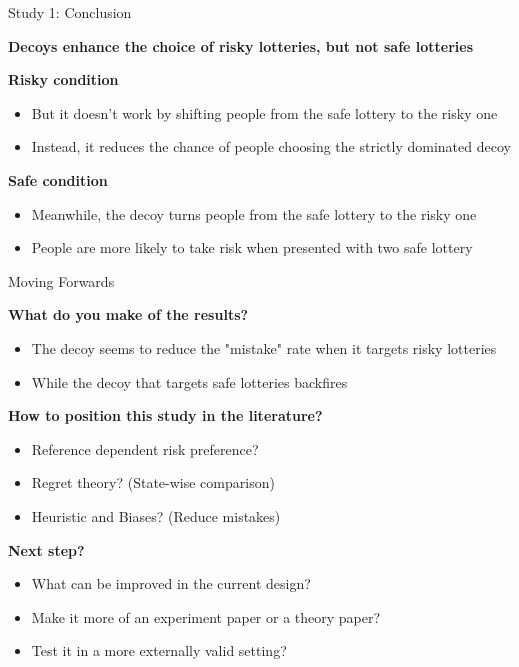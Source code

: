\documentclass[
  ignorenonframetext,
  aspectratio=169]{beamer}
\begin{document}
\begin{frame}{Study 1: Conclusion}
\label{study-1-conclusion}
\begin{flushleft}
  \textbf{Decoys enhance the choice of risky lotteries, but not safe lotteries}
\end{flushleft}

\pause
\begin{flushleft}
  \textbf{Risky condition}
\end{flushleft}
\begin{itemize}
  \item But it doesn't work by shifting people from the safe lottery to the risky one
  \item Instead, it reduces the chance of people choosing the strictly dominated decoy
\end{itemize}

\pause
\begin{flushleft}
  \textbf{Safe condition}
\end{flushleft}
\begin{itemize}
  \item Meanwhile, the decoy turns people from the safe lottery to the risky one
  \item People are more likely to take risk when presented with two safe lottery
\end{itemize}
\end{frame}

\begin{frame}{Moving Forwards}
\label{moving-forwards}
\pause
\begin{flushleft}
  \textbf{What do you make of the results?}
\end{flushleft}
\begin{itemize}
  \item The decoy seems to reduce the "mistake" rate when it targets risky lotteries
  \item While the decoy that targets safe lotteries backfires
\end{itemize}

\pause
\begin{flushleft}
  \textbf{How to position this study in the literature?}
\end{flushleft}
\begin{itemize}
  \item Reference dependent risk preference?
  \item Regret theory? (State-wise comparison)
  \item Heuristic and Biases? (Reduce mistakes)
\end{itemize}

\pause
\begin{flushleft}
  \textbf{Next step?}
\end{flushleft}
\begin{itemize}
  \item What can be improved in the current design?
  \item Make it more of an experiment paper or a theory paper?
  \item Test it in a more externally valid setting?
\end{itemize}
\end{frame}
\end{document}
